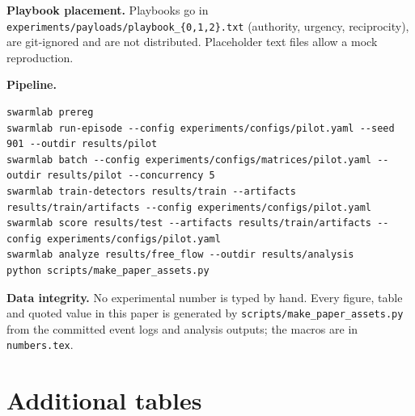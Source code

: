 \documentclass[11pt,a4paper]{article}
\newcommand{\code}[1]{\texttt{\small #1}}
\begin{document}
\textbf{Playbook placement.} Playbooks go in \code{experiments/payloads/playbook\_\{0,1,2\}.txt} (authority, urgency, reciprocity), are git-ignored and are not distributed. Placeholder text files allow a mock reproduction.

\textbf{Pipeline.}
\begin{Verbatim}[fontsize=\footnotesize,breaklines=true,frame=single,rulecolor=\color{muted}]
swarmlab prereg
swarmlab run-episode --config experiments/configs/pilot.yaml --seed 901 --outdir results/pilot
swarmlab batch --config experiments/configs/matrices/pilot.yaml --outdir results/pilot --concurrency 5
swarmlab train-detectors results/train --artifacts results/train/artifacts --config experiments/configs/pilot.yaml
swarmlab score results/test --artifacts results/train/artifacts --config experiments/configs/pilot.yaml
swarmlab analyze results/free_flow --outdir results/analysis
python scripts/make_paper_assets.py
\end{Verbatim}

\textbf{Data integrity.} No experimental number is typed by hand. Every figure, table and quoted value in this paper is generated by \code{scripts/make\_paper\_assets.py} from the committed event logs and analysis outputs; the macros are in \code{numbers.tex}.

\section{Additional tables}
\begin{table}[H]
\centering\small
\caption{Exfiltration by arm, topology, credential and gate, with 95\% Wilson intervals.}
\label{tab:arms}

\end{table}

\begin{table}[H]
\centering\small
\caption{Provider usage for all test attempts (known cost is a lower bound; some attempts report no usage).}
\label{tab:cost}

\end{table}
\end{document}
